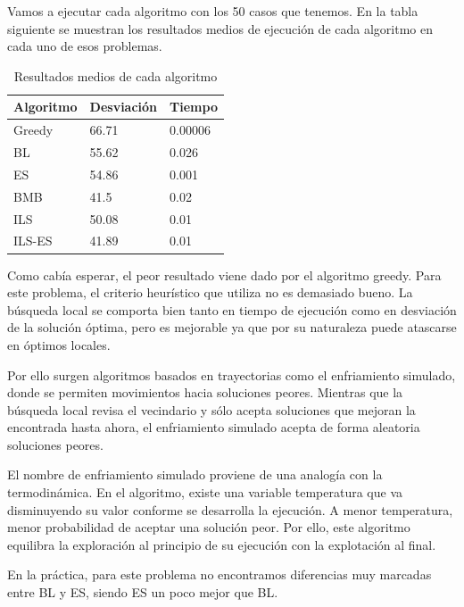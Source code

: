 Vamos a ejecutar cada algoritmo con los 50 casos que tenemos. En la tabla siguiente se muestran los resultados medios de ejecución de cada algoritmo en cada uno de esos problemas.

\begin{table}[H]
\centering
\caption{Resultados medios de cada algoritmo}
\begin{tabular}{@{}lll@{}}
\toprule
\textbf{Algoritmo} & \textbf{Desviación} & \textbf{Tiempo} \\ \midrule
Greedy             & 66.71               & 0.00006         \\ \midrule
BL                 & 55.62               & 0.026           \\
ES                 & 54.86               & 0.001           \\ \midrule
BMB                & 41.5                & 0.02            \\
ILS                & 50.08               & 0.01            \\
ILS-ES             & 41.89               & 0.01            \\ \bottomrule
\end{tabular}
\end{table}

Como cabía esperar, el peor resultado viene dado por el algoritmo greedy. Para este problema, el criterio heurístico que utiliza no es demasiado bueno. La búsqueda local se comporta bien tanto en tiempo de ejecución como en desviación de la solución óptima, pero es mejorable ya que por su naturaleza puede atascarse en óptimos locales. 

Por ello surgen algoritmos basados en trayectorias como el enfriamiento simulado, donde se permiten movimientos hacia soluciones peores. Mientras que la búsqueda local revisa el vecindario y sólo acepta soluciones que mejoran la encontrada hasta ahora, el enfriamiento simulado acepta de forma aleatoria soluciones peores.

El nombre de enfriamiento simulado proviene de una analogía con la termodinámica. En el algoritmo, existe una variable temperatura que va disminuyendo su valor conforme se desarrolla la ejecución. A menor temperatura, menor probabilidad de aceptar una solución peor. Por ello, este algoritmo equilibra la exploración al principio de su ejecución con la explotación al final.

En la práctica, para este problema no encontramos diferencias muy marcadas entre BL y ES, siendo ES un poco mejor que BL. 

